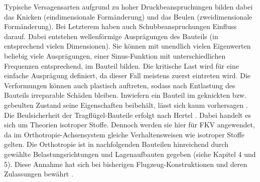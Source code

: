 \noindent Typische Versagensarten aufgrund zu hoher Druckbeanspruchungen bilden dabei das Knicken (eindimensionale Formänderung) und das Beulen (zweidimensionale Formänderung). Bei Letzterem haben auch Schubbeanspruchungen Einfluss darauf. Dabei entstehen wellenförmige Ausprägungen des Bauteils (in entsprechend vielen Dimensionen). Sie können mit unendlich vielen Eigenwerten beliebig viele Ausprägungen, einer Sinus-Funktion mit unterschiedlichen Frequenzen entsprechend, im Bauteil bilden. Die kritische Last wird für eine einfache Ausprägung definiert, da dieser Fall meistens zuerst eintreten wird. Die Verformungen können auch plastisch auftreten, sodass nach Entlastung des Bauteils irreparable Schäden bleiben. Inwiefern ein Bauteil im geknickten bzw. gebeulten Zustand seine Eigenschaften beibehält, lässt sich kaum vorhersagen \cite{item16}.\\

\noindent Die Beulsicherheit der Tragflügel-Bauteile erfolgt nach Hertel \cite{item1}. Dabei handelt es sich um Theorien isotroper Stoffe. Dennoch werden sie hier für FKV angewendet, da im Orthotropie-Achsensystem gleiche Verhaltensweisen wie isotroper Stoffe gelten. Die Orthotropie ist in nachfolgenden Bauteilen hinreichend durch gewählte Belastungsrichtungen und Lagenaufbauten gegeben (siehe Kapitel 4 und 5). Diese Annahme hat sich bei bisherigen Flugzeug-Konstruktionen und deren Zulassungen bewährt \cite{item21}.\\

